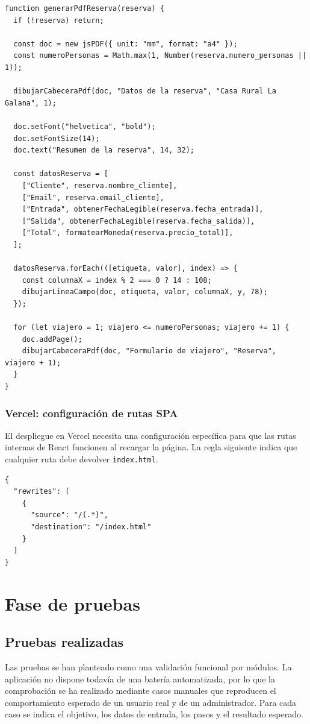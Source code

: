 \documentclass[11pt,a4paper]{article}
\begin{document}
\begin{verbatim}
function generarPdfReserva(reserva) {
  if (!reserva) return;

  const doc = new jsPDF({ unit: "mm", format: "a4" });
  const numeroPersonas = Math.max(1, Number(reserva.numero_personas || 1));

  dibujarCabeceraPdf(doc, "Datos de la reserva", "Casa Rural La Galana", 1);

  doc.setFont("helvetica", "bold");
  doc.setFontSize(14);
  doc.text("Resumen de la reserva", 14, 32);

  const datosReserva = [
    ["Cliente", reserva.nombre_cliente],
    ["Email", reserva.email_cliente],
    ["Entrada", obtenerFechaLegible(reserva.fecha_entrada)],
    ["Salida", obtenerFechaLegible(reserva.fecha_salida)],
    ["Total", formatearMoneda(reserva.precio_total)],
  ];

  datosReserva.forEach(([etiqueta, valor], index) => {
    const columnaX = index % 2 === 0 ? 14 : 108;
    dibujarLineaCampo(doc, etiqueta, valor, columnaX, y, 78);
  });

  for (let viajero = 1; viajero <= numeroPersonas; viajero += 1) {
    doc.addPage();
    dibujarCabeceraPdf(doc, "Formulario de viajero", "Reserva", viajero + 1);
  }
}
\end{verbatim}

\subsubsection{Vercel: configuración de rutas SPA}
El despliegue en Vercel necesita una configuración específica para que las rutas internas de React funcionen al recargar la página. La regla siguiente indica que cualquier ruta debe devolver \texttt{index.html}.

\begin{verbatim}
{
  "rewrites": [
    {
      "source": "/(.*)",
      "destination": "/index.html"
    }
  ]
}
\end{verbatim}

\section{Fase de pruebas}

\subsection{Pruebas realizadas}
Las pruebas se han planteado como una validación funcional por módulos. La aplicación no dispone todavía de una batería automatizada, por lo que la comprobación se ha realizado mediante casos manuales que reproducen el comportamiento esperado de un usuario real y de un administrador. Para cada caso se indica el objetivo, los datos de entrada, los pasos y el resultado esperado.
\end{document}
